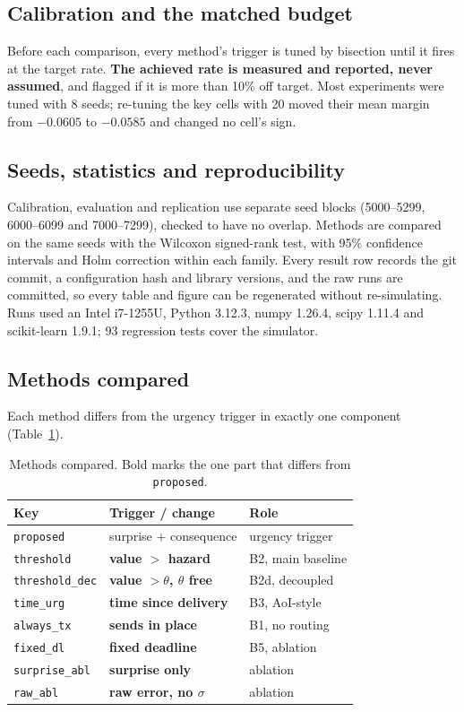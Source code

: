 \documentclass[pdflatex,sn-mathphys-num,iicol]{sn-jnl}
\theoremstyle{thmstyleone}
\theoremstyle{thmstyletwo}
\theoremstyle{thmstylethree}
\begin{document}
\subsection{Calibration and the matched budget}

Before each comparison, every method's trigger is tuned by bisection until it fires at the
target rate. \textbf{The achieved rate is measured and reported, never assumed}, and
flagged if it is more than 10\% off target. Most experiments were tuned with 8 seeds;
re-tuning the key cells with 20 moved their mean margin from $-0.0605$ to $-0.0585$ and
changed no cell's sign.

\subsection{Seeds, statistics and reproducibility}

Calibration, evaluation and replication use separate seed blocks (5000--5299, 6000--6099
and 7000--7299), checked to have no overlap. Methods are compared on the same seeds with
the Wilcoxon signed-rank test, with 95\% confidence intervals and Holm correction within
each family. Every result row records the git commit, a configuration hash and library
versions, and the raw runs are committed, so every table and figure can be regenerated
without re-simulating. Runs used an Intel i7-1255U, Python 3.12.3, numpy 1.26.4, scipy
1.11.4 and scikit-learn 1.9.1; 93 regression tests cover the simulator.

\subsection{Methods compared}

Each method differs from the urgency trigger in exactly one component (Table~\ref{tab:methods}).

\begin{table}[t]
\caption{Methods compared. Bold marks the one part that differs from \texttt{proposed}.}
\label{tab:methods}
\centering
\footnotesize
\setlength{\tabcolsep}{3pt}
\begin{tabular}{@{}lll@{}}
\toprule
\textbf{Key} & \textbf{Trigger / change} & \textbf{Role} \\
\midrule
\texttt{proposed} & surprise $+$ consequence & urgency trigger \\
\texttt{threshold} & \textbf{value $>$ hazard} & B2, main baseline \\
\texttt{threshold\_dec} & \textbf{value $>\theta$, $\theta$ free} & B2d, decoupled \\
\texttt{time\_urg} & \textbf{time since delivery} & B3, AoI-style \\
\texttt{always\_tx} & \textbf{sends in place} & B1, no routing \\
\texttt{fixed\_dl} & \textbf{fixed deadline} & B5, ablation \\
\texttt{surprise\_abl} & \textbf{surprise only} & ablation \\
\texttt{raw\_abl} & \textbf{raw error, no $\sigma$} & ablation \\
\bottomrule
\end{tabular}
\end{table}
\end{document}

